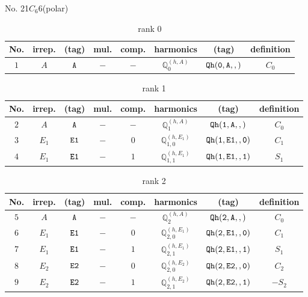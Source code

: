 \documentclass[fleqn,8pt]{jsarticle}
\begin{document}
\setcounter{MaxMatrixCols}{16}

\begin{center}
\LARGE
No. 21\quad$C_{6}$\quad$6$\quad[ hexagonal ] (polar)
\end{center}
\begin{table}[ht!]
\begin{center}
\caption{rank 0}
\renewcommand{\arraystretch}{1.3}
\begin{tabular}{cccccccc} \hline \hline
No. & irrep. & (tag) & mul. & comp. & harmonics & (tag) & definition \\ \hline
$ 1 $ & $ A $ & $ {\tt A} $ & $ - $ & $ - $ & $ \mathbb{Q}_{0}^{(h,A)} $ & $ {\tt Qh(0,A,,)} $ & $ C_{0} $ \\
 \hline \hline
\end{tabular}
\end{center}
\end{table}
\begin{table}[ht!]
\begin{center}
\caption{rank 1}
\renewcommand{\arraystretch}{1.3}
\begin{tabular}{cccccccc} \hline \hline
No. & irrep. & (tag) & mul. & comp. & harmonics & (tag) & definition \\ \hline
$ 2 $ & $ A $ & $ {\tt A} $ & $ - $ & $ - $ & $ \mathbb{Q}_{1}^{(h,A)} $ & $ {\tt Qh(1,A,,)} $ & $ C_{0} $ \\
$ 3 $ & $ E_{1} $ & $ {\tt E1} $ & $ - $ & $ 0 $ & $ \mathbb{Q}_{1,0}^{(h,E_{1})} $ & $ {\tt Qh(1,E1,,0)} $ & $ C_{1} $ \\
$ 4 $ & $ E_{1} $ & $ {\tt E1} $ & $ - $ & $ 1 $ & $ \mathbb{Q}_{1,1}^{(h,E_{1})} $ & $ {\tt Qh(1,E1,,1)} $ & $ S_{1} $ \\
 \hline \hline
\end{tabular}
\end{center}
\end{table}
\begin{table}[ht!]
\begin{center}
\caption{rank 2}
\renewcommand{\arraystretch}{1.3}
\begin{tabular}{cccccccc} \hline \hline
No. & irrep. & (tag) & mul. & comp. & harmonics & (tag) & definition \\ \hline
$ 5 $ & $ A $ & $ {\tt A} $ & $ - $ & $ - $ & $ \mathbb{Q}_{2}^{(h,A)} $ & $ {\tt Qh(2,A,,)} $ & $ C_{0} $ \\
$ 6 $ & $ E_{1} $ & $ {\tt E1} $ & $ - $ & $ 0 $ & $ \mathbb{Q}_{2,0}^{(h,E_{1})} $ & $ {\tt Qh(2,E1,,0)} $ & $ C_{1} $ \\
$ 7 $ & $ E_{1} $ & $ {\tt E1} $ & $ - $ & $ 1 $ & $ \mathbb{Q}_{2,1}^{(h,E_{1})} $ & $ {\tt Qh(2,E1,,1)} $ & $ S_{1} $ \\
$ 8 $ & $ E_{2} $ & $ {\tt E2} $ & $ - $ & $ 0 $ & $ \mathbb{Q}_{2,0}^{(h,E_{2})} $ & $ {\tt Qh(2,E2,,0)} $ & $ C_{2} $ \\
$ 9 $ & $ E_{2} $ & $ {\tt E2} $ & $ - $ & $ 1 $ & $ \mathbb{Q}_{2,1}^{(h,E_{2})} $ & $ {\tt Qh(2,E2,,1)} $ & $ - S_{2} $ \\
 \hline \hline
\end{tabular}
\end{center}
\end{table}
\end{document}
